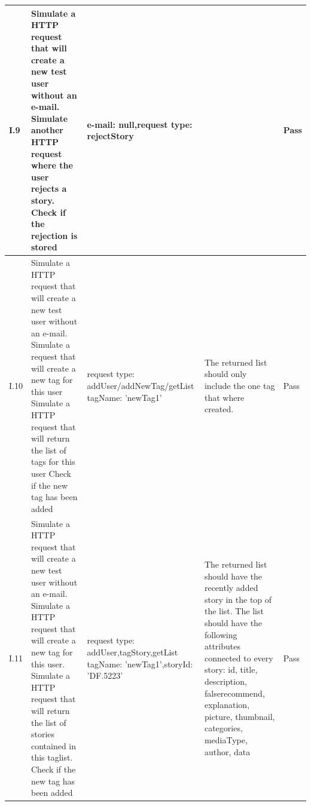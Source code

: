 \begin{appendices}
\begin{center}
\begin{longtable}{ | p{1cm} | p{5.5cm} | p{4cm} | p{4.5cm} | p{2cm}|}
		I.9 & Simulate a HTTP request that will create a new test user without an e-mail. \newline  \newline  Simulate another HTTP request where the user rejects a story.  \newline  \newline Check if the rejection is stored & e-mail: null,\newline request type: rejectStory  &  & Pass \\ \hline
		
		I.10 & Simulate a HTTP request that will create a new test user without an e-mail. \newline  Simulate a  request that will create a new tag for this user \newline Simulate a HTTP request that will return the list of tags for this user \newline Check if the new tag has been added  & request type: addUser/addNewTag/getList  tagName: 'newTag1' & The returned list should only include the one tag that where created.& Pass\\ \hline
		
		I.11 & Simulate a HTTP request that will create a new test user without an e-mail. \newline  Simulate a HTTP request that will create a new tag for this user. \newline Simulate a HTTP request that will return the list of stories contained in this taglist. \newline Check if the new tag has been added  & request type: addUser,tagStory,getList \newline tagName: 'newTag1',\newline storyId: 'DF.5223' & The returned list should have the recently added story in the top of the list. The list should have the following attributes connected to every story: id, title, description, false\textunderscore recommend, explanation, picture, thumbnail, categories, mediaType, author, data  & Pass\\ \hline
		

\end{longtable}
\end{center}
\end{appendices}
